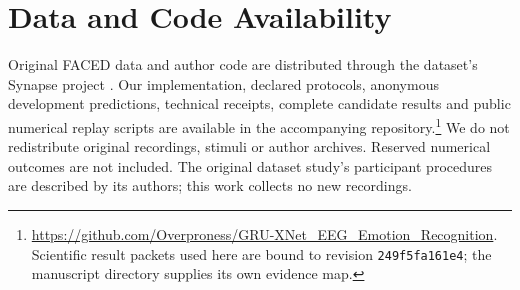 \documentclass[conference]{IEEEtran}
\begin{document}
\section*{Data and Code Availability}
Original FACED data and author code are distributed through the dataset's Synapse project \cite{chen2023faced}. Our implementation, declared protocols, anonymous development predictions, technical receipts, complete candidate results and public numerical replay scripts are available in the accompanying repository.\footnote{\url{https://github.com/Overproness/GRU-XNet_EEG_Emotion_Recognition}. Scientific result packets used here are bound to revision \texttt{249f5fa161e4}; the manuscript directory supplies its own evidence map.} We do not redistribute original recordings, stimuli or author archives. Reserved numerical outcomes are not included. The original dataset study's participant procedures are described by its authors; this work collects no new recordings.

\newpage


\end{document}
